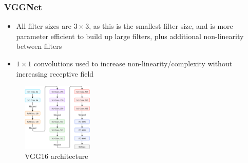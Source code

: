 \subsubsection{VGGNet}
\begin{itemize}
	\item All filter sizes are $3\times 3$, as this is the smallest filter size, and is more parameter efficient to build up large filters, plus additional non-linearity between filters
	\item $1\times 1$ convolutions used to increase non-linearity/complexity without increasing receptive field
\end{itemize}
\begin{figure}[ht!]
	\centering
	\includegraphics[width=0.3\textwidth]{figures/CNN_VGGnet.png}
	\caption{VGG16 architecture}
	\label{fig:CNN_VVGnet}
\end{figure}

